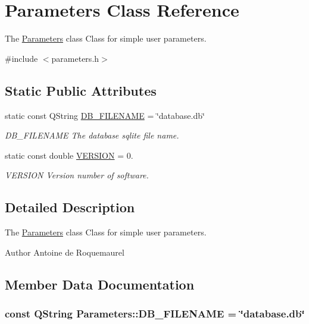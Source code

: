 \hypertarget{classParameters}{\section{Parameters Class Reference}
\label{classParameters}
}


The \hyperlink{classParameters}{Parameters} class Class for simple user parameters.  




{\ttfamily \#include $<$parameters.\-h$>$}

\subsection*{Static Public Attributes}
\begin{DoxyCompactItemize}
\item 
static const Q\-String \hyperlink{classParameters_a80b98bd51d910bcc2203afcacbc7df87}{D\-B\-\_\-\-F\-I\-L\-E\-N\-A\-M\-E} = \char`\"{}database.\-db\char`\"{}
\begin{DoxyCompactList}\small\item\em D\-B\-\_\-\-F\-I\-L\-E\-N\-A\-M\-E The database sqlite file name. \end{DoxyCompactList}\item 
static const double \hyperlink{classParameters_a279ee24140c761de46178daa8960bdc8}{V\-E\-R\-S\-I\-O\-N} = 0.
\begin{DoxyCompactList}\small\item\em V\-E\-R\-S\-I\-O\-N Version number of software. \end{DoxyCompactList}\end{DoxyCompactItemize}


\subsection{Detailed Description}
The \hyperlink{classParameters}{Parameters} class Class for simple user parameters. 

\begin{DoxyAuthor}{Author}
Antoine de Roquemaurel 
\end{DoxyAuthor}


\subsection{Member Data Documentation}
\hypertarget{classParameters_a80b98bd51d910bcc2203afcacbc7df87}{
\subsubsection[{D\-B\-\_\-\-F\-I\-L\-E\-N\-A\-M\-E}]{\setlength{\rightskip}{0pt plus 5cm}const Q\-String Parameters\-::\-D\-B\-\_\-\-F\-I\-L\-E\-N\-A\-M\-E = \char`\"{}database.\-db\char`\"{}\hspace{0.3cm}{\ttfamily [static]}}}\label{classParameters_a80b98bd51d910bcc2203afcacbc7df87}


